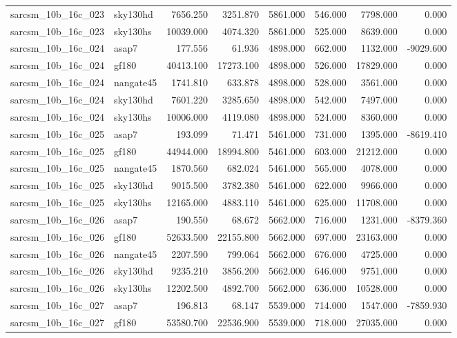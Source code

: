 \begin{tabular}{llrrrrrr}
sarcsm\_10b\_16c\_023 & sky130hd & 7656.250 & 3251.870 & 5861.000 & 546.000 & 7798.000 & 0.000 \\
sarcsm\_10b\_16c\_023 & sky130hs & 10039.000 & 4074.320 & 5861.000 & 525.000 & 8639.000 & 0.000 \\
sarcsm\_10b\_16c\_024 & asap7 & 177.556 & 61.936 & 4898.000 & 662.000 & 1132.000 & -9029.600 \\
sarcsm\_10b\_16c\_024 & gf180 & 40413.100 & 17273.100 & 4898.000 & 526.000 & 17829.000 & 0.000 \\
sarcsm\_10b\_16c\_024 & nangate45 & 1741.810 & 633.878 & 4898.000 & 528.000 & 3561.000 & 0.000 \\
sarcsm\_10b\_16c\_024 & sky130hd & 7601.220 & 3285.650 & 4898.000 & 542.000 & 7497.000 & 0.000 \\
sarcsm\_10b\_16c\_024 & sky130hs & 10006.000 & 4119.080 & 4898.000 & 524.000 & 8360.000 & 0.000 \\
sarcsm\_10b\_16c\_025 & asap7 & 193.099 & 71.471 & 5461.000 & 731.000 & 1395.000 & -8619.410 \\
sarcsm\_10b\_16c\_025 & gf180 & 44944.000 & 18994.800 & 5461.000 & 603.000 & 21212.000 & 0.000 \\
sarcsm\_10b\_16c\_025 & nangate45 & 1870.560 & 682.024 & 5461.000 & 565.000 & 4078.000 & 0.000 \\
sarcsm\_10b\_16c\_025 & sky130hd & 9015.500 & 3782.380 & 5461.000 & 622.000 & 9966.000 & 0.000 \\
sarcsm\_10b\_16c\_025 & sky130hs & 12165.000 & 4883.110 & 5461.000 & 625.000 & 11708.000 & 0.000 \\
sarcsm\_10b\_16c\_026 & asap7 & 190.550 & 68.672 & 5662.000 & 716.000 & 1231.000 & -8379.360 \\
sarcsm\_10b\_16c\_026 & gf180 & 52633.500 & 22155.800 & 5662.000 & 697.000 & 23163.000 & 0.000 \\
sarcsm\_10b\_16c\_026 & nangate45 & 2207.590 & 799.064 & 5662.000 & 676.000 & 4725.000 & 0.000 \\
sarcsm\_10b\_16c\_026 & sky130hd & 9235.210 & 3856.200 & 5662.000 & 646.000 & 9751.000 & 0.000 \\
sarcsm\_10b\_16c\_026 & sky130hs & 12202.500 & 4892.700 & 5662.000 & 636.000 & 10528.000 & 0.000 \\
sarcsm\_10b\_16c\_027 & asap7 & 196.813 & 68.147 & 5539.000 & 714.000 & 1547.000 & -7859.930 \\
sarcsm\_10b\_16c\_027 & gf180 & 53580.700 & 22536.900 & 5539.000 & 718.000 & 27035.000 & 0.000 \\

\end{tabular}
